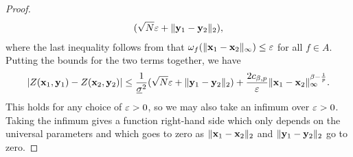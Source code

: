 \documentclass[12pt]{report}
\begin{document}
\begin{proof}
\begin{align}
                (\sqrt{N} \varepsilon + \lVert\mathbf{y}_1 - \mathbf{y}_2\rVert_2),
    \end{align}
    where the last inequality follows from that $\omega_f(\lVert\mathbf{x}_1 - \mathbf{x}_2\rVert_\infty) \le \varepsilon$ for all $f \in A$.
    Putting the bounds for the two terms together, we have
    \begin{equation}
        \lvert Z(\mathbf{x}_1, \mathbf{y}_1) - Z(\mathbf{x}_2, \mathbf{y}_2)\rvert
        \le 
            \frac{1}{\underline{\sigma}^2}(\sqrt{N}\varepsilon + \lVert\mathbf{y}_1 - \mathbf{y}_2\rVert_2)
            + \frac{2 c_{\beta, p}}{\varepsilon} \lVert\mathbf{x}_1 - \mathbf{x}_2\rVert_\infty^{\beta - \frac{1}{p}}.
    \end{equation}
    This holds for any choice of $\varepsilon > 0$, so we may also take an infimum over $\varepsilon > 0$.
    Taking the infimum gives a function right-hand side which only depends on the universal parameters
    and which goes to zero as 
    $\lVert\mathbf{x}_1 - \mathbf{x}_2\rVert_2$ and $\lVert\mathbf{y}_1 - \mathbf{y}_2\rVert_2$ go to zero.
\end{proof}
\end{document}
